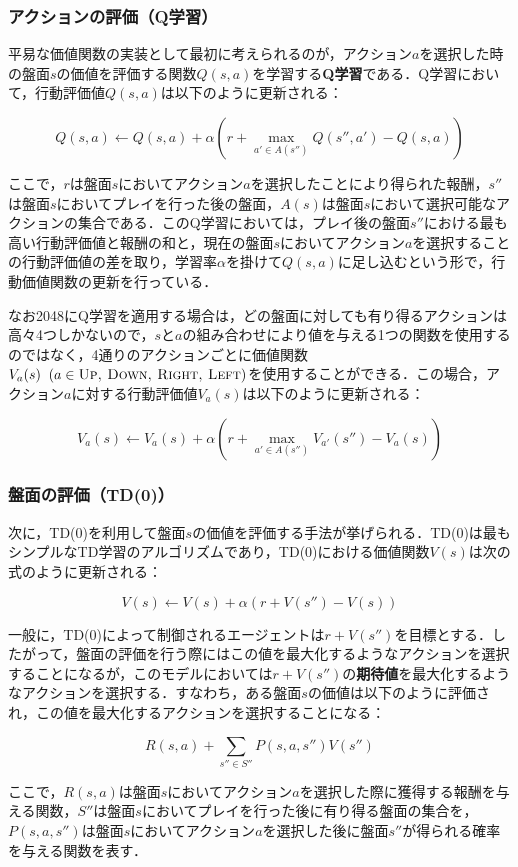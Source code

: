 \documentclass{suribt}
\begin{document}
\subsubsection{アクションの評価（Q学習）}
平易な価値関数の実装として最初に考えられるのが，アクション$a$を選択した時の盤面$s$の価値を評価する関数$Q(s,a)$を学習する\textbf{Q学習}である．Q学習において，行動評価値$Q(s,a)$は以下のように更新される：

\[
	Q(s,a) \leftarrow Q(s,a) + {\alpha} (r + \max_{a' \in A(s'')} Q(s'', a') - Q(s,a))
\]

ここで，$r$は盤面$s$においてアクション$a$を選択したことにより得られた報酬，$s''$は盤面$s$においてプレイを行った後の盤面，$A(s)$は盤面$s$において選択可能なアクションの集合である．このQ学習においては，プレイ後の盤面$s''$における最も高い行動評価値と報酬の和と，現在の盤面$s$においてアクション$a$を選択することの行動評価値の差を取り，学習率${\alpha}$を掛けて$Q(s,a)$に足し込むという形で，行動価値関数の更新を行っている．

なお2048にQ学習を適用する場合は，どの盤面に対しても有り得るアクションは高々4つしかないので，$s$と$a$の組み合わせにより値を与える1つの関数を使用するのではなく，4通りのアクションごとに価値関数$V_a(s) \;\; (a \in \text{\textsc{Up, Down, Right, Left}})$を使用することができる\cite{Szubert}．この場合，アクション$a$に対する行動評価値$V_a(s)$は以下のように更新される：

\[
	V_a(s) \leftarrow V_a(s) + {\alpha} (r + \max_{a' \in A(s'')} V_{a'}(s'') - V_a(s))
\]

\subsubsection{盤面の評価（TD(0)）}
次に，TD(0)を利用して盤面$s$の価値を評価する手法が挙げられる．TD(0)は最もシンプルなTD学習のアルゴリズムであり，TD(0)における価値関数$V(s)$は次の式のように更新される：

\[
	V(s) \leftarrow V(s) + \alpha (r + V(s'') - V(s) )
\]

一般に，TD(0)によって制御されるエージェントは$r+V(s'')$を目標とする\cite{Sutton}．したがって，盤面の評価を行う際にはこの値を最大化するようなアクションを選択することになるが，このモデルにおいては$r+V(s'')$の\textbf{期待値}を最大化するようなアクションを選択する．すなわち，ある盤面$s$の価値は以下のように評価され，この値を最大化するアクションを選択することになる：

\[
	R(s,a) + \sum_{s'' \in S''} P(s,a,s'')V(s'')
\]

ここで，$R(s,a)$は盤面$s$においてアクション$a$を選択した際に獲得する報酬を与える関数，$S''$は盤面$s$においてプレイを行った後に有り得る盤面の集合を，$P(s,a,s'')$は盤面$s$においてアクション$a$を選択した後に盤面$s''$が得られる確率を与える関数を表す．
\end{document}
